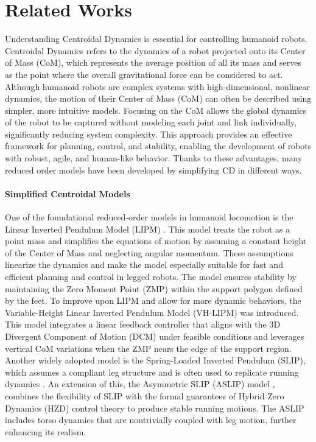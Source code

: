 \documentclass[main.tex]{subfiles}
\begin{document}
\section{Related Works}\label{sec:relatedworks}
\begin{sloppypar}
Understanding Centroidal Dynamics is essential for controlling humanoid robots. Centroidal Dynamics \cite{orin2013centroidal} refers to the dynamics of a robot projected onto its Center of Mass (CoM),  which represents the average position of all its mass and serves as the point where the overall gravitational force can be considered to act. Although humanoid robots are complex systems with high-dimensional, nonlinear dynamics, the motion of their Center of Mass (CoM) can often be described using simpler, more intuitive models. Focusing on the CoM allows the global dynamics of the robot to be captured without modeling each joint and link individually, significantly reducing system complexity. This approach provides an effective framework for planning, control, and stability, enabling the development of robots with robust, agile, and human-like behavior. Thanks to these advantages, many reduced order models have been developed by simplifying CD in different ways.\\
\paragraph{Simplified Centroidal Models} One of the foundational reduced-order models in humanoid locomotion is the Linear Inverted Pendulum Model (LIPM) \cite{kajita1991study}. This model treats the robot as a point mass and simplifies the equations of motion by assuming a constant height of the Center of Mass and neglecting angular momentum. These assumptions linearize the dynamics and make the model especially suitable for fast and efficient planning and control in legged robots. The model ensures stability by maintaining the Zero Moment Point (ZMP) within the support polygon defined by the feet. To improve upon LIPM and allow for more dynamic behaviors, the Variable-Height Linear Inverted Pendulum Model (VH-LIPM) \cite{caron2020biped} was introduced. This model integrates a linear feedback controller that aligns with the 3D Divergent Component of Motion (DCM) \cite{englsberger2015three} under feasible conditions and leverages vertical CoM variations when the ZMP nears the edge of the support region. Another widely adopted model is the Spring-Loaded Inverted Pendulum (SLIP), which assumes a compliant leg structure and is often used to replicate running dynamics \cite{full1999templates, holmes2006dynamics}. An extension of this, the Asymmetric SLIP (ASLIP) model \cite{poulakakis2009spring}, combines the flexibility of SLIP with the formal guarantees of Hybrid Zero Dynamics (HZD) \cite{westervelt2003hybrid} control theory to produce stable running motions. The ASLIP includes torso dynamics that are nontrivially coupled with leg motion, further enhancing its realism.

\end{sloppypar}
\end{document}
